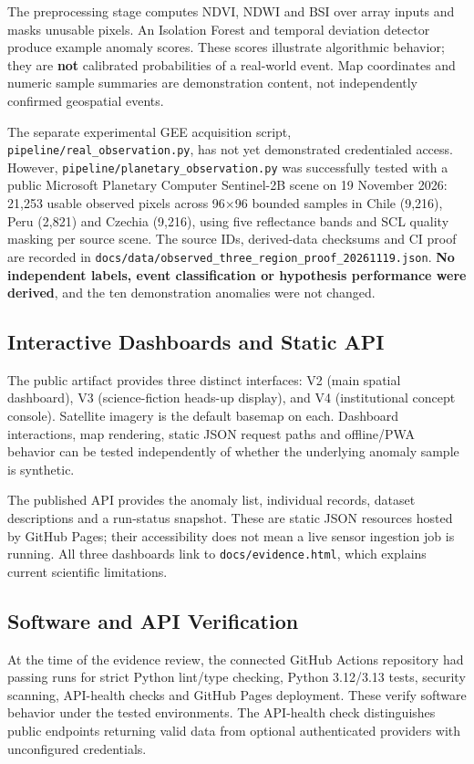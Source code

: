 The preprocessing stage computes NDVI, NDWI and BSI over array inputs and masks unusable pixels. An Isolation Forest and temporal deviation detector produce example anomaly scores. These scores illustrate algorithmic behavior; they are \textbf{not} calibrated probabilities of a real-world event. Map coordinates and numeric sample summaries are demonstration content, not independently confirmed geospatial events.

The separate experimental GEE acquisition script, \texttt{pipeline/real\_observation.py}, has not yet demonstrated credentialed access. However, \texttt{pipeline/planetary\_observation.py} was successfully tested with a public Microsoft Planetary Computer Sentinel-2B scene on 19 November 2026: 21,253 usable observed pixels across 96×96 bounded samples in Chile (9,216), Peru (2,821) and Czechia (9,216), using five reflectance bands and SCL quality masking per source scene. The source IDs, derived-data checksums and CI proof are recorded in \texttt{docs/data/observed\_three\_region\_proof\_20261119.json}. \textbf{No independent labels, event classification or hypothesis performance were derived}, and the ten demonstration anomalies were not changed.

\subsection{Interactive Dashboards and Static API}

The public artifact provides three distinct interfaces: V2 (main spatial dashboard), V3 (science-fiction heads-up display), and V4 (institutional concept console). Satellite imagery is the default basemap on each. Dashboard interactions, map rendering, static JSON request paths and offline/PWA behavior can be tested independently of whether the underlying anomaly sample is synthetic.

The published API provides the anomaly list, individual records, dataset descriptions and a run-status snapshot. These are static JSON resources hosted by GitHub Pages; their accessibility does not mean a live sensor ingestion job is running. All three dashboards link to \texttt{docs/evidence.html}, which explains current scientific limitations.

\subsection{Software and API Verification}

At the time of the evidence review, the connected GitHub Actions repository had passing runs for strict Python lint/type checking, Python 3.12/3.13 tests, security scanning, API-health checks and GitHub Pages deployment. These verify software behavior under the tested environments. The API-health check distinguishes public endpoints returning valid data from optional authenticated providers with unconfigured credentials.

